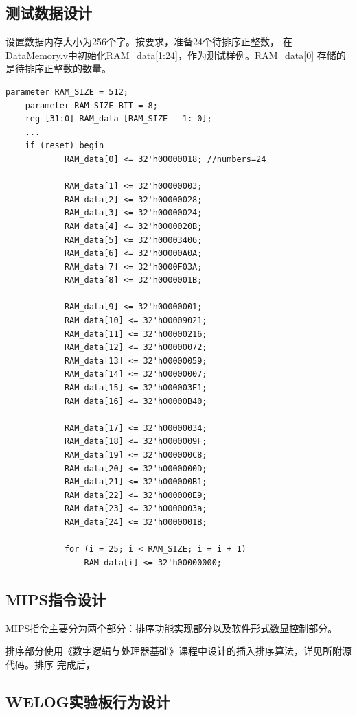 \documentclass[10pt]{article}
\begin{document}
\subsection{测试数据设计}
设置数据内存大小为256个字。按要求，准备24个待排序正整数，
在DataMemory.v中初始化RAM_data[1:24]，作为测试样例。RAM_data[0]
存储的是待排序正整数的数量。
\begin{lstlisting}[style={verilog-style}]
    parameter RAM_SIZE = 512;
    parameter RAM_SIZE_BIT = 8;
    reg [31:0] RAM_data [RAM_SIZE - 1: 0];
    ...
    if (reset) begin
            RAM_data[0] <= 32'h00000018; //numbers=24
            
            RAM_data[1] <= 32'h00000003; 
            RAM_data[2] <= 32'h00000028; 
            RAM_data[3] <= 32'h00000024; 
            RAM_data[4] <= 32'h0000020B; 
            RAM_data[5] <= 32'h00003406; 
            RAM_data[6] <= 32'h00000A0A; 
            RAM_data[7] <= 32'h0000F03A; 
            RAM_data[8] <= 32'h0000001B; 
            
            RAM_data[9] <= 32'h00000001; 
            RAM_data[10] <= 32'h00009021; 
            RAM_data[11] <= 32'h00000216; 
            RAM_data[12] <= 32'h00000072; 
            RAM_data[13] <= 32'h00000059; 
            RAM_data[14] <= 32'h00000007; 
            RAM_data[15] <= 32'h000003E1; 
            RAM_data[16] <= 32'h00000B40; 
            
            RAM_data[17] <= 32'h00000034; 
            RAM_data[18] <= 32'h0000009F; 
            RAM_data[19] <= 32'h000000C8;
            RAM_data[20] <= 32'h0000000D; 
            RAM_data[21] <= 32'h000000B1; 
            RAM_data[22] <= 32'h000000E9; 
            RAM_data[23] <= 32'h0000003a; 
            RAM_data[24] <= 32'h0000001B; 
        
            for (i = 25; i < RAM_SIZE; i = i + 1)
                RAM_data[i] <= 32'h00000000;
\end{lstlisting}
\subsection{MIPS指令设计}
MIPS指令主要分为两个部分：排序功能实现部分以及软件形式数显控制部分。

排序部分使用《数字逻辑与处理器基础》课程中设计的插入排序算法，详见所附源代码。排序
完成后，
\subsection{WELOG实验板行为设计}
\end{document}
